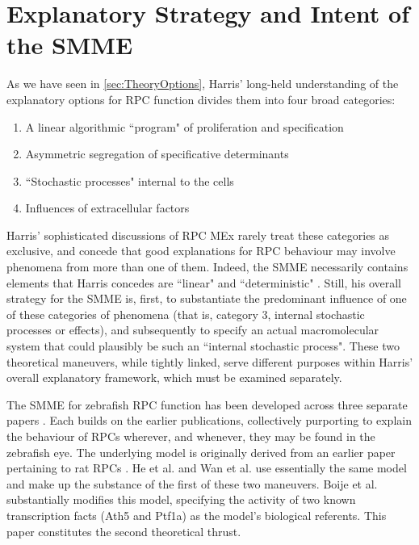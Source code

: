 \section{Explanatory Strategy and Intent of the SMME}
\label{sec:SMMEexplanatorystrat}
As we have seen in \autoref{sec:TheoryOptions}, Harris' long-held understanding of the explanatory options for RPC function divides them into four broad categories:

\begin{enumerate}
\item A linear algorithmic ``program" of proliferation and specification
\item Asymmetric segregation of specificative determinants
\item ``Stochastic processes" internal to the cells
\item Influences of extracellular factors
\end{enumerate}

Harris' sophisticated discussions of RPC MEx rarely treat these categories as exclusive, and concede that good explanations for RPC behaviour may involve phenomena from more than one of them. Indeed, the SMME necessarily contains elements that Harris concedes are ``linear" and ``deterministic" \cite{He2012}. Still, his overall strategy for the SMME is, first, to substantiate the predominant influence of one of these categories of phenomena (that is, category 3, internal stochastic processes or effects), and subsequently to specify an actual macromolecular system that could plausibly be such an ``internal stochastic process". These two theoretical maneuvers, while tightly linked, serve different purposes within Harris' overall explanatory framework, which must be examined separately.

The SMME for zebrafish RPC function has been developed across three separate papers \cite{He2012,Boije2015,Wan2016}. Each builds on the earlier publications, collectively purporting to explain the behaviour of RPCs wherever, and whenever, they may be found in the zebrafish eye. The underlying model is originally derived from an earlier paper pertaining to rat RPCs \cite{Gomes2011}. He et al. \cite{He2012} and Wan et al. \cite{Wan2016} use essentially the same model and make up the substance of the first of these two maneuvers. Boije et al. \cite{Boije2015} substantially modifies this model, specifying the activity of two known transcription facts (Ath5 and Ptf1a) as the model's biological referents. This paper constitutes the second theoretical thrust.

